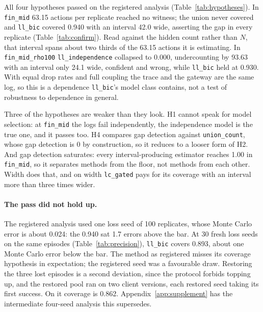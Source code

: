 \documentclass[11pt]{article}
\begin{document}
All four hypotheses passed on the registered analysis
(Table~\ref{tab:hypotheses}). In \texttt{fin\_mid} 63.15 actions per replicate
reached no witness; the union never covered and \texttt{ll\_bic} covered 0.940
with an interval 42.0 wide, asserting the gap in every replicate
(Table~\ref{tab:confirm}). Read against the hidden count rather than $N$, that
interval spans about two thirds of the 63.15 actions it is estimating. In \texttt{fin\_mid\_rho100}
\texttt{ll\_independence} collapsed to 0.000, undercounting by 93.63 with an
interval only 24.1 wide, confident and wrong, while \texttt{ll\_bic} held at
0.930. With equal drop rates and full coupling the trace and the gateway are the
same log, so this is a dependence \texttt{ll\_bic}'s model class contains, not a
test of robustness to dependence in general.

Three of the hypotheses are weaker than they look. H1 cannot speak for model
selection: at \texttt{fin\_mid} the logs fail independently, the independence
model is the true one, and it passes too. H4 compares gap detection against
\texttt{union\_count}, whose gap detection is 0 by construction, so it reduces to a
looser form of H2. And gap detection saturates: every interval-producing estimator
reaches 1.00 in \texttt{fin\_mid}, so it separates methods from the floor, not
methods from each other. Width does that, and on width \texttt{lc\_gated} pays for
its coverage with an interval more than three times wider.

\paragraph{The pass did not hold up.}
The registered analysis used one loss seed of 100 replicates, whose Monte Carlo
error is about 0.024: the 0.940 sat 1.7 errors above the bar. At 30 fresh loss
seeds on the same episodes (Table~\ref{tab:precision}), \texttt{ll\_bic} covers
0.893, about one Monte Carlo error below the bar. The method as registered
misses its coverage hypothesis in expectation; the registered seed was a
favourable draw. Restoring the three lost episodes is a second deviation, since
the protocol forbids topping up, and the restored pool ran on two client
versions, each restored seed taking its first success. On it coverage is 0.862.
Appendix~\ref{app:supplement} has the intermediate four-seed analysis this
supersedes.

\begin{table}[h]
\centering

\caption{\texttt{ll\_bic} at \texttt{fin\_mid} at higher precision, by linkage.
Post hoc.}
\label{tab:precision}
\end{table}
\end{document}
